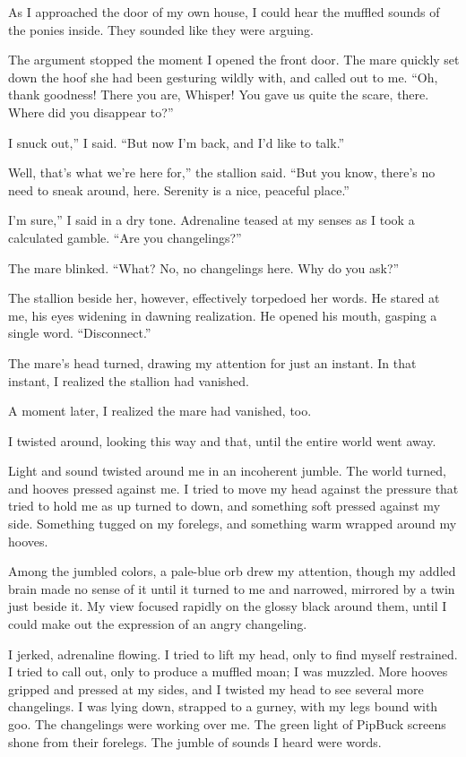 As I approached the door of my own house, I could hear the muffled sounds of the ponies inside. They sounded like they were arguing.

The argument stopped the moment I opened the front door. The mare quickly set down the hoof she had been gesturing wildly with, and called out to me. “Oh, thank goodness! There you are, Whisper! You gave us quite the scare, there. Where did you disappear to?”

\leavevmode{}I snuck out,” I said. “But now I’m back, and I’d like to talk.”

\leavevmode{}Well, that’s what we’re here for,” the stallion said. “But you know, there’s no need to sneak around, here. Serenity is a nice, peaceful place.”

\leavevmode{}I’m sure,” I said in a dry tone. Adrenaline teased at my senses as I took a calculated gamble. “Are you changelings?”

The mare blinked. “What? No, no changelings here. Why do you ask?”

The stallion beside her, however, effectively torpedoed her words. He stared at me, his eyes widening in dawning realization. He opened his mouth, gasping a single word. “Disconnect.”

The mare’s head turned, drawing my attention for just an instant. In that instant, I realized the stallion had vanished.

A moment later, I realized the mare had vanished, too.

I twisted around, looking this way and that, until the entire world went away.

{\br}%
Light and sound twisted around me in an incoherent jumble. The world turned, and hooves pressed against me. I tried to move my head against the pressure that tried to hold me as up turned to down, and something soft pressed against my side. Something tugged on my forelegs, and something warm wrapped around my hooves.

Among the jumbled colors, a pale-blue orb drew my attention, though my addled brain made no sense of it until it turned to me and narrowed, mirrored by a twin just beside it. My view focused rapidly on the glossy black around them, until I could make out the expression of an angry changeling.

I jerked, adrenaline flowing. I tried to lift my head, only to find myself restrained. I tried to call out, only to produce a muffled moan; I was muzzled. More hooves gripped and pressed at my sides, and I twisted my head to see several more changelings. I was lying down, strapped to a gurney, with my legs bound with goo. The changelings were working over me. The green light of PipBuck screens shone from their forelegs. The jumble of sounds I heard were words.


